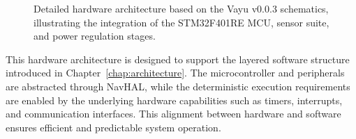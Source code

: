 \begin{figure}[H]
    \caption{Detailed hardware architecture based on the Vayu v0.0.3 schematics, illustrating the integration of the STM32F401RE MCU, sensor suite, and power regulation stages.}
    \label{fig:hardware_overview}
\end{figure}

This hardware architecture is designed to support the layered software structure introduced in Chapter~\ref{chap:architecture}. The microcontroller and peripherals are abstracted through NavHAL, while the deterministic execution requirements are enabled by the underlying hardware capabilities such as timers, interrupts, and communication interfaces. This alignment between hardware and software ensures efficient and predictable system operation.